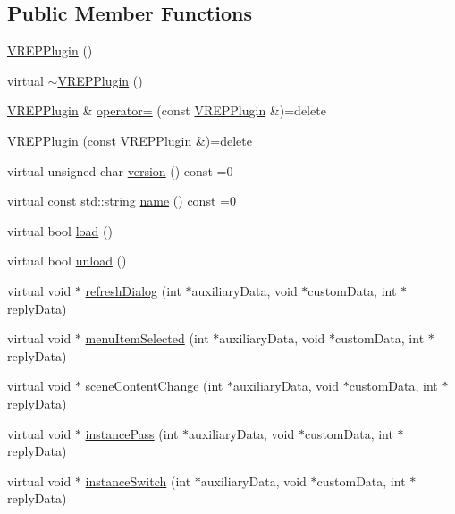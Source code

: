 \subsection*{Public Member Functions}
\begin{DoxyCompactItemize}
\item 
\hyperlink{classVREPPlugin_a5a2044c242eaa032a5608cd8c3b77fad}{V\+R\+E\+P\+Plugin} ()
\item 
virtual \hyperlink{classVREPPlugin_a73d3e01b6cb22ab256107eba5f97a08d}{$\sim$\+V\+R\+E\+P\+Plugin} ()
\item 
\hyperlink{classVREPPlugin}{V\+R\+E\+P\+Plugin} \& \hyperlink{classVREPPlugin_aac9c374d0718ea48d6ec5baa8d8ab2b2}{operator=} (const \hyperlink{classVREPPlugin}{V\+R\+E\+P\+Plugin} \&)=delete
\item 
\hyperlink{classVREPPlugin_accb66d8b1e8ded95475a15a3a42c9fbc}{V\+R\+E\+P\+Plugin} (const \hyperlink{classVREPPlugin}{V\+R\+E\+P\+Plugin} \&)=delete
\item 
virtual unsigned char \hyperlink{classVREPPlugin_ae5e6764e97874aa134447122bbadbf2a}{version} () const =0
\item 
virtual const std\+::string \hyperlink{classVREPPlugin_a345987cf0e2e8aa3af817cc0213e5c7a}{name} () const =0
\item 
virtual bool \hyperlink{classVREPPlugin_a4149b72b671ad72f63e9a75c58c0d628}{load} ()
\item 
virtual bool \hyperlink{classVREPPlugin_a49aff8a71c1c9f2af6e32b918eba99ff}{unload} ()
\item 
virtual void $\ast$ \hyperlink{classVREPPlugin_aae582606dda4aff564d102358b9af579}{refresh\+Dialog} (int $\ast$auxiliary\+Data, void $\ast$custom\+Data, int $\ast$reply\+Data)
\item 
virtual void $\ast$ \hyperlink{classVREPPlugin_a320dcb5ed4beaec82975be22b5c20e39}{menu\+Item\+Selected} (int $\ast$auxiliary\+Data, void $\ast$custom\+Data, int $\ast$reply\+Data)
\item 
virtual void $\ast$ \hyperlink{classVREPPlugin_a7df55bb967c9f217c77add60bb0d3868}{scene\+Content\+Change} (int $\ast$auxiliary\+Data, void $\ast$custom\+Data, int $\ast$reply\+Data)
\item 
virtual void $\ast$ \hyperlink{classVREPPlugin_affe1c1f37ffa8e04ea93e9eda9399402}{instance\+Pass} (int $\ast$auxiliary\+Data, void $\ast$custom\+Data, int $\ast$reply\+Data)
\item 
virtual void $\ast$ \hyperlink{classVREPPlugin_ae288b5fdec3fee292f23e61a021f4f5e}{instance\+Switch} (int $\ast$auxiliary\+Data, void $\ast$custom\+Data, int $\ast$reply\+Data)

\end{DoxyCompactItemize}
